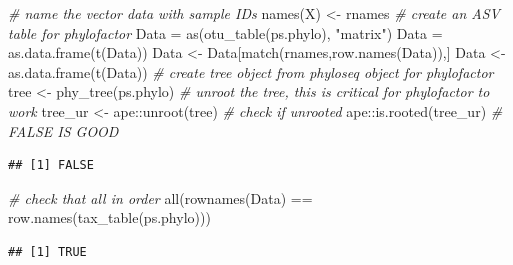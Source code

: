 \documentclass[
]{book}
\newenvironment{Shaded}{\begin{snugshade}}{\end{snugshade}}
\newcommand{\CommentTok}[1]{\textcolor[rgb]{0.56,0.35,0.01}{\textit{#1}}}
\newcommand{\FunctionTok}[1]{\textcolor[rgb]{0.00,0.00,0.00}{#1}}
\newcommand{\NormalTok}[1]{#1}
\newcommand{\OtherTok}[1]{\textcolor[rgb]{0.56,0.35,0.01}{#1}}
\newcommand{\SpecialCharTok}[1]{\textcolor[rgb]{0.00,0.00,0.00}{#1}}
\newcommand{\StringTok}[1]{\textcolor[rgb]{0.31,0.60,0.02}{#1}}
\begin{document}
\begin{Shaded}
\begin{Highlighting}[]
\CommentTok{\# name the vector data with sample IDs }
\FunctionTok{names}\NormalTok{(X) }\OtherTok{\textless{}{-}}\NormalTok{ rnames}
\CommentTok{\# create an ASV table for phylofactor }
\NormalTok{Data }\OtherTok{=} \FunctionTok{as}\NormalTok{(}\FunctionTok{otu\_table}\NormalTok{(ps.phylo), }\StringTok{"matrix"}\NormalTok{)}
\NormalTok{Data }\OtherTok{=} \FunctionTok{as.data.frame}\NormalTok{(}\FunctionTok{t}\NormalTok{(Data))}
\NormalTok{Data }\OtherTok{\textless{}{-}}\NormalTok{ Data[}\FunctionTok{match}\NormalTok{(rnames,}\FunctionTok{row.names}\NormalTok{(Data)),] }
\NormalTok{Data }\OtherTok{\textless{}{-}} \FunctionTok{as.data.frame}\NormalTok{(}\FunctionTok{t}\NormalTok{(Data))}
\CommentTok{\# create tree object from phyloseq object for phylofactor}
\NormalTok{tree }\OtherTok{\textless{}{-}} \FunctionTok{phy\_tree}\NormalTok{(ps.phylo) }
\CommentTok{\# unroot the tree, this is critical for phylofactor to work}
\NormalTok{tree\_ur }\OtherTok{\textless{}{-}}\NormalTok{ ape}\SpecialCharTok{::}\FunctionTok{unroot}\NormalTok{(tree)}
\CommentTok{\# check if unrooted}
\NormalTok{ape}\SpecialCharTok{::}\FunctionTok{is.rooted}\NormalTok{(tree\_ur) }\CommentTok{\# FALSE IS GOOD}
\end{Highlighting}
\end{Shaded}

\begin{verbatim}
## [1] FALSE
\end{verbatim}

\begin{Shaded}
\begin{Highlighting}[]
\CommentTok{\# check that all in order}
\FunctionTok{all}\NormalTok{(}\FunctionTok{rownames}\NormalTok{(Data) }\SpecialCharTok{==} \FunctionTok{row.names}\NormalTok{(}\FunctionTok{tax\_table}\NormalTok{(ps.phylo))) }
\end{Highlighting}
\end{Shaded}

\begin{verbatim}
## [1] TRUE
\end{verbatim}

\begin{Shaded}
\end{Shaded}
\end{document}
